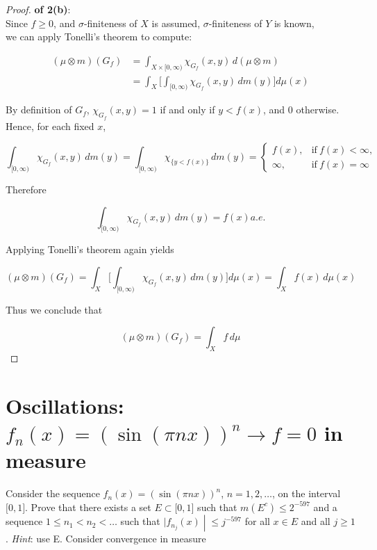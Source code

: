 \begin{proof}

\textbf{of 2(b)}:\\
Since \(f \geq 0\), and \(\sigma\)-finiteness of \(X\) is assumed, \(\sigma\)-finiteness of \(Y\) is known,\\
we can apply Tonelli's theorem to compute:

\[\begin{matrix}
{(\mu \otimes m)(G_{f})} & {= \int_{X \times \lbrack 0,\infty)}\chi_{G_{f}}(x,y)\, d(\mu \otimes m)} \\
 & {= \int_{X}\lbrack\int_{\lbrack 0,\infty)}\chi_{G_{f}}(x,y)\, dm(y)\rbrack d\mu(x)}
\end{matrix}\]

By definition of \(G_{f}\), \(\chi_{G_{f}}(x,y) = 1\) if and only if \(y < f(x)\), and \(0\) otherwise. Hence, for each fixed \(x\),

\[\int_{\lbrack 0,\infty)}\chi_{G_{f}}(x,y)\, dm(y) = \int_{\lbrack 0,\infty)}\chi_{\{{y < f(x)}\}}\, dm(y) = \left\{ \begin{matrix}
{f(x),} & {\text{if}\ f(x) < \infty,} \\
{\infty,} & {\text{if}\ f(x) = \infty}
\end{matrix} \right.\]

Therefore

\[\int_{\lbrack 0,\infty)}\chi_{G_{f}}(x,y)\, dm(y) = f(x) a.e.\]

Applying Tonelli's theorem again yields

\[(\mu \otimes m)(G_{f}) = \int_{X}\lbrack\int_{\lbrack 0,\infty)}\chi_{G_{f}}(x,y)\, dm(y)\rbrack d\mu(x) = \int_{X}f(x)\, d\mu(x)\]

Thus we conclude that

\[(\mu \otimes m)(G_{f}) = \int_{X}f\, d\mu\]

\end{proof}

\section{\texorpdfstring{Oscillations: \(f_{n}(x) = (\sin(\pi nx))^{n}\rightarrow f = 0\) in measure}{Oscillations: f\_\{n\}(x) = (\textbackslash sin(\textbackslash pi nx))\^{}\{n\}\textbackslash rightarrow f = 0 in measure}}\label{oscillations-f_nxsinpi-n-xn-to-f-0-in-measure}

Consider the sequence \(f_{n}(x) = (\sin(\pi nx))^{n}\), \(n = 1,2,\ldots\), on the interval \(\lbrack 0,1\rbrack\). Prove that there exists a set \(E \subset \lbrack 0,1\rbrack\) such that \(m(E^{c}) \leq 2^{- 597}\) and a sequence \(1 \leq n_{1} < n_{2} < \ldots\) such that \(\left. |f_{n_{j}}(x) \middle| \leq j^{- 597} \right.\) for all \(x \in E\) and all \(j \geq 1\). \emph{Hint}: use E. Consider convergence in measure

